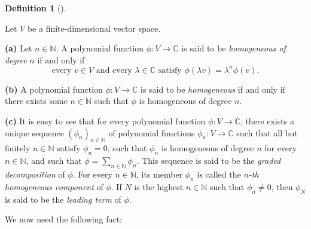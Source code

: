 \documentclass
[numbers=enddot,12pt,final,onecolumn,german,notitlepage]{scrartcl}%
\theoremstyle{definition}
\newtheorem{defi}[theo]{Definition}
\newenvironment{definition}[1][]
{\begin{defi}[#1]\begin{leftbar}}
{\end{leftbar}\end{defi}}
\begin{document}
\begin{definition}
\label{def.det.US.poly.hom}Let $V$ be a finite-dimensional vector space.

\textbf{(a)} Let $n\in\mathbb{N}$. A polynomial function $\phi:V\rightarrow
\mathbb{C}$ is said to be \textit{homogeneous of degree }$n$ if and only if%
\[
\text{every }v\in V\text{ and every }\lambda\in\mathbb{C}\text{ satisfy }%
\phi\left(  \lambda v\right)  =\lambda^{n}\phi\left(  v\right)  .
\]


\textbf{(b)} A polynomial function $\phi:V\rightarrow\mathbb{C}$ is said to be
\textit{homogeneous} if and only if there exists some $n\in\mathbb{N}$ such
that $\phi$ is homogeneous of degree $n$.

\textbf{(c)} It is easy to see that for every polynomial function
$\phi:V\rightarrow\mathbb{C}$, there exists a unique sequence $\left(
\phi_{n}\right)  _{n\in\mathbb{N}}$ of polynomial functions $\phi
_{n}:V\rightarrow\mathbb{C}$ such that all but finitely $n\in\mathbb{N}$
satisfy $\phi_{n}=0$, such that $\phi_{n}$ is homogeneous of degree $n$ for
every $n\in\mathbb{N}$, and such that $\phi=\sum\limits_{n\in\mathbb{N}}%
\phi_{n}$. This sequence is said to be the \textit{graded decomposition} of
$\phi$. For every $n\in\mathbb{N}$, its member $\phi_{n}$ is called the
$n$\textit{-th homogeneous component} of $\phi$. If $N$ is the highest
$n\in\mathbb{N}$ such that $\phi_{n}\neq0$, then $\phi_{N}$ is said to be the
\textit{leading term} of $\phi$.
\end{definition}

We now need the following fact:
\end{document}
